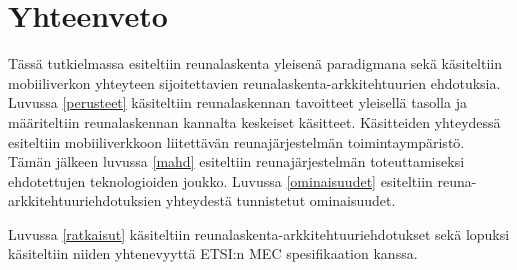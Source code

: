 \section{Yhteenveto} \label{yhteenveto}
Tässä tutkielmassa esiteltiin reunalaskenta yleisenä paradigmana sekä käsiteltiin mobiiliverkon yhteyteen sijoitettavien reunalaskenta-arkkitehtuurien ehdotuksia.
Luvussa \ref{perusteet} käsiteltiin reunalaskennan tavoitteet yleisellä tasolla ja määriteltiin reunalaskennan kannalta keskeiset käsitteet. Käsitteiden yhteydessä esiteltiin mobiiliverkkoon liitettävän reunajärjestelmän toimintaympäristö.
Tämän jälkeen luvussa \ref{mahd} esiteltiin reunajärjestelmän toteuttamiseksi ehdotettujen teknologioiden joukko. 
Luvussa \ref{ominaisuudet} esiteltiin reuna-arkkitehtuuriehdotuksien yhteydestä tunnistetut ominaisuudet.

Luvussa \ref{ratkaisut} käsiteltiin reunalaskenta-arkkitehtuuriehdotukset sekä lopuksi käsiteltiin niiden yhtenevyyttä ETSI:n MEC spesifikaation kanssa.

